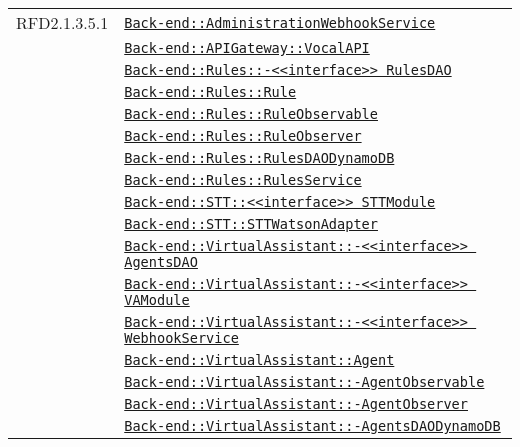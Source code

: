 \begin{longtable}{|>{\centering}m{3cm}|m{10cm}<{\centering}|}
RFD2.1.3.5.1 & \hyperref[Back-end::AdministrationWebhookService]{\texttt{Back-end::AdministrationWebhookService}}\\
& \hyperref[Back-end::APIGateway::VocalAPI]{\texttt{Back-end::APIGateway::VocalAPI}}\\
& \hyperref[Back-end::Rules::<<interface>> RulesDAO]{\texttt{Back-end::Rules::-\linebreak <<interface>> RulesDAO}}\\
& \hyperref[Back-end::Rules::Rule]{\texttt{Back-end::Rules::Rule}}\\
& \hyperref[Back-end::Rules::RuleObservable]{\texttt{Back-end::Rules::RuleObservable}}\\
& \hyperref[Back-end::Rules::RuleObserver]{\texttt{Back-end::Rules::RuleObserver}}\\
& \hyperref[Back-end::Rules::RulesDAODynamoDB]{\texttt{Back-end::Rules::RulesDAODynamoDB}}\\
& \hyperref[Back-end::Rules::RulesService]{\texttt{Back-end::Rules::RulesService}}\\
& \hyperref[Back-end::STT::<<interface>> STTModule]{\texttt{Back-end::STT::<<interface>> STTModule}}\\
& \hyperref[Back-end::STT::STTWatsonAdapter]{\texttt{Back-end::STT::STTWatsonAdapter}}\\
& \hyperref[Back-end::VirtualAssistant::<<interface>> AgentsDAO]{\texttt{Back-end::VirtualAssistant::-\linebreak <<interface>> AgentsDAO}}\\
& \hyperref[Back-end::VirtualAssistant::<<interface>> VAModule]{\texttt{Back-end::VirtualAssistant::-\linebreak <<interface>> VAModule}}\\
& \hyperref[Back-end::VirtualAssistant::<<interface>> WebhookService]{\texttt{Back-end::VirtualAssistant::-\linebreak <<interface>> WebhookService}}\\
& \hyperref[Back-end::VirtualAssistant::Agent]{\texttt{Back-end::VirtualAssistant::Agent}}\\
& \hyperref[Back-end::VirtualAssistant::AgentObservable]{\texttt{Back-end::VirtualAssistant::-\linebreak AgentObservable}}\\
& \hyperref[Back-end::VirtualAssistant::AgentObserver]{\texttt{Back-end::VirtualAssistant::-\linebreak AgentObserver}}\\
& \hyperref[Back-end::VirtualAssistant::AgentsDAODynamoDB]{\texttt{Back-end::VirtualAssistant::-\linebreak AgentsDAODynamoDB}}\\

\end{longtable}
